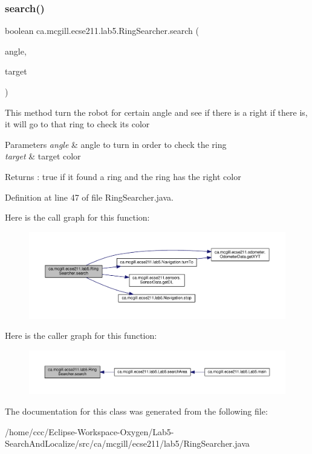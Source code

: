 \subsubsection{\texorpdfstring{search()}{search()}}
{\footnotesize\ttfamily boolean ca.\+mcgill.\+ecse211.\+lab5.\+Ring\+Searcher.\+search (\begin{DoxyParamCaption}\item[{int}]{angle,  }\item[{Color\+Calibrator.\+Color}]{target }\end{DoxyParamCaption})}

This method turn the robot for certain angle and see if there is a right if there is, it will go to that ring to check its color 
\begin{DoxyParams}{Parameters}
{\em angle} & angle to turn in order to check the ring \\
\hline
{\em target} & target color \\
\hline
\end{DoxyParams}
\begin{DoxyReturn}{Returns}
\+: true if it found a ring and the ring has the right color 
\end{DoxyReturn}


Definition at line 47 of file Ring\+Searcher.\+java.

Here is the call graph for this function\+:
\nopagebreak
\begin{figure}[H]
\begin{center}
\leavevmode
\includegraphics[width=350pt]{classca_1_1mcgill_1_1ecse211_1_1lab5_1_1_ring_searcher_a88a4c77f3c76d74edc8bfd0229f0902f_cgraph}
\end{center}
\end{figure}
Here is the caller graph for this function\+:
\nopagebreak
\begin{figure}[H]
\begin{center}
\leavevmode
\includegraphics[width=350pt]{classca_1_1mcgill_1_1ecse211_1_1lab5_1_1_ring_searcher_a88a4c77f3c76d74edc8bfd0229f0902f_icgraph}
\end{center}
\end{figure}


The documentation for this class was generated from the following file\+:\begin{DoxyCompactItemize}
\item 
/home/ccc/\+Eclipse-\/\+Workspace-\/\+Oxygen/\+Lab5-\/\+Search\+And\+Localize/src/ca/mcgill/ecse211/lab5/Ring\+Searcher.\+java\end{DoxyCompactItemize}
